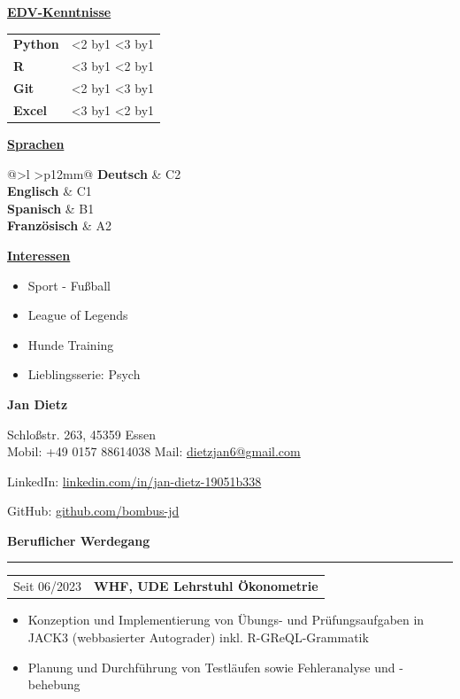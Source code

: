 \documentclass[10pt,a4paper]{article}
\makeatletter
\providecommand{\faCircle}{\large\textbullet} %
\newcommand{\sidehead}[1]{\vspace{1ex}\textbf{\large #1}\par\vspace{0.4em}}
\newcommand{\sectiontitle}[1]{\vspace{1.0em}\textbf{\large #1}\par\vspace{0.25em}\hrule\vspace{0.6em}}
\newcommand{\cventry}[3]{%
  \noindent
  \begin{tabularx}{\linewidth}{@{}p{28mm}X@{}}
    \raggedright\small\textsf{#1} & \textbf{#2} \\
  \end{tabularx}
  \vspace{0.2em}
  #3
  \vspace{0.8em}
}
\newcommand{\reptoken}[2]{%
  \begingroup\@tempcnta=0\relax
  \loop\ifnum\@tempcnta<#1 #2\advance\@tempcnta by1\relax\repeat
  \endgroup}
\newcommand{\pictofraction}[6]{%
  {\begingroup #6%
    \reptoken{#3}{\textcolor{#2}{#1}}%
    \reptoken{#5}{\textcolor{#4}{#1}}%
  \endgroup}}
\newcommand{\skillrow}[3]{%
  \textbf{#1} & \pictofraction{\faCircle}{cvgreen}{#2}{black!30}{#3}{\tiny} \\}
\newcommand{\langrow}[2]{\textbf{#1} & #2\\}
\newlength{\photoH}
\makeatother
\begin{document}
\begin{paracol}{2}
\sidehead{\underline{EDV-Kenntnisse}}
\setlength{\tabcolsep}{4pt}
\begin{tabularx}{\linewidth}{@{}>{\bfseries}l >{\raggedright\arraybackslash}X@{}}
  \skillrow{Python}{2}{3}
  \skillrow{R}{3}{2}
  \skillrow{Git}{2}{3}
  \skillrow{Excel}{3}{2}
\end{tabularx}


\sidehead{\underline{Sprachen}}
\begin{tabularx}{\linewidth}{@{}>{\bfseries}l >{\centering\arraybackslash}p{12mm}@{}}
  \langrow{Deutsch}{C2}
  \langrow{Englisch}{C1}
  \langrow{Spanisch}{B1}
  \langrow{Französisch}{A2}
\end{tabularx}


\sidehead{\underline{Interessen}}
\begin{itemize}
  \item Sport - Fußball
  \item League of Legends
  \item Hunde Training
  \item Lieblingsserie: Psych
  \end{itemize}

\vfill

\switchcolumn
\raggedright\color{textgray}

\parbox[b][\photoH][t]{\linewidth}{%
  {\LARGE \textbf{Jan Dietz}}\par \vspace{5mm}
  Schloßstr. 263, 45359 Essen \\
  Mobil: +49 0157 88614038 \quad
  Mail: \href{mailto:dietzjan6@gmail.com}{dietzjan6@gmail.com}\par
  LinkedIn: \href{https://linkedin.com/in/jan-dietz-19051b338}{linkedin.com/in/jan-dietz-19051b338} \par
  GitHub: \href{https://github.com/bombus-jd}{github.com/bombus-jd}
}

{\small
{}

\sectiontitle{Beruflicher Werdegang}

\cventry{Seit 06/2023}{WHF, UDE Lehrstuhl Ökonometrie}{%
\begin{itemize}
  \item Konzeption und Implementierung von Übungs- und Prüfungsaufgaben in JACK3 (webbasierter Autograder) inkl. R-GReQL-Grammatik
  \item Planung und Durchführung von Testläufen sowie Fehleranalyse und -behebung
\end{itemize}}

}
\end{paracol}
\end{document}
